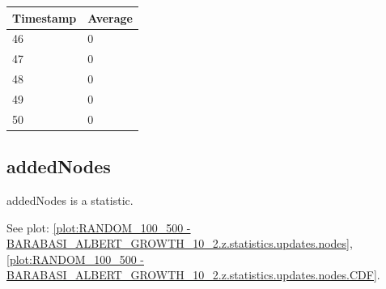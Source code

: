 \begin{tabular}{|l||l|}
\hline
	\textbf{Timestamp} & \textbf{Average} \\ \hline
	46 & 0 \\ \hline
	47 & 0 \\ \hline
	48 & 0 \\ \hline
	49 & 0 \\ \hline
	50 & 0 \\ \hline
\end{tabular}

\subsection{addedNodes}
addedNodes is a statistic.

See plot: \ref{plot:RANDOM_100_500 - BARABASI_ALBERT_GROWTH_10_2.z.statistics.updates.nodes}, \ref{plot:RANDOM_100_500 - BARABASI_ALBERT_GROWTH_10_2.z.statistics.updates.nodes.CDF}.

